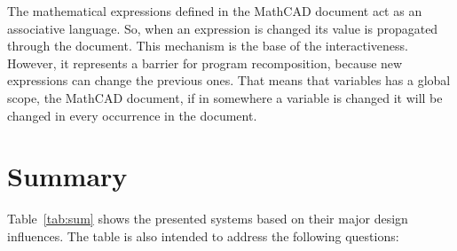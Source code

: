 The mathematical expressions defined in the MathCAD document act as an associative language. So, when an expression is changed its value is propagated through the document. This mechanism is the base of the interactiveness. However, it represents a barrier for program recomposition, because new expressions can change the previous ones. That means that variables has a global scope, the MathCAD document, if in somewhere a variable is changed it will be changed in every occurrence in the document.   
\section{Summary}

Table~\ref{tab:sum} shows the presented systems based on their major design influences. The table is also intended to address the following questions:

